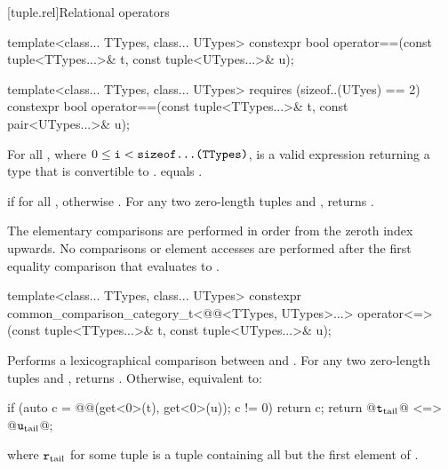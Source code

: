 \documentclass{wg21}
\begin{document}
[tuple.rel]{Relational operators}

\begin{itemdecl}
template<class... TTypes, class... UTypes>
constexpr bool operator==(const tuple<TTypes...>& t, const tuple<UTypes...>& u);
\end{itemdecl}

\begin{addedblock}
\begin{itemdecl}
template<class... TTypes, class... UTypes>
requires (sizeof..(UTyes) == 2)
constexpr bool operator==(const tuple<TTypes...>& t, const pair<UTypes...>& u);
\end{itemdecl}
\end{addedblock}

\begin{itemdescr}
    \pnum
    \mandates
    For all ,
    where $0 \leq \texttt{i} < \texttt{sizeof...(TTypes)}$,
     is a valid expression
    returning a type that is convertible to .
     equals
    .
    
    \pnum
    \returns
     if  for all
    , otherwise .
    For any two zero-length tuples  and ,  returns .
    
    \pnum
    \effects
    The elementary comparisons are performed in order from the
    zeroth index upwards.  No comparisons or element accesses are
    performed after the first equality comparison that evaluates to
    .
\end{itemdescr}

%
\begin{itemdecl}
template<class... TTypes, class... UTypes>
constexpr common_comparison_category_t<@@<TTypes, UTypes>...>
operator<=>(const tuple<TTypes...>& t, const tuple<UTypes...>& u);
\end{itemdecl}

\begin{itemdescr}
    \pnum
    \effects
    Performs a lexicographical comparison between  and .
    For any two zero-length tuples  and ,
     returns .
    Otherwise, equivalent to:
    \begin{codeblock}
        if (auto c = @@(get<0>(t), get<0>(u)); c != 0) return c;
        return @$\texttt{t}_\mathrm{tail}$@ <=> @$\texttt{u}_\mathrm{tail}$@;
    \end{codeblock}
    where $\texttt{r}_\mathrm{tail}$ for some tuple 
    is a tuple containing all but the first element of .
\end{itemdescr}
\end{document}

